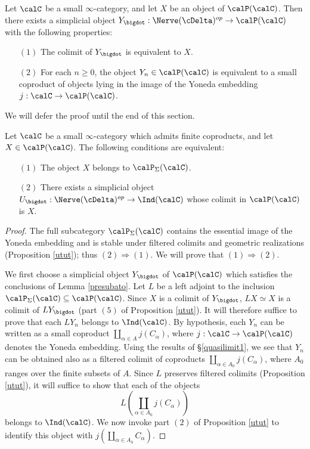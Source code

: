 \begin{lemma}\label{presubato}
Let $\calC$ be a small $\infty$-category, and let $X$ be an object of $\calP(\calC)$. Then
there exists a simplicial object $Y_{\bigdot}: \Nerve(\cDelta)^{op} \rightarrow \calP(\calC)$ with the following properties:
\begin{itemize}
\item[$(1)$] The colimit of $Y_{\bigdot}$ is equivalent to $X$.
\item[$(2)$] For each $n \geq 0$, the object $Y_n \in \calP(\calC)$ is equivalent to a small coproduct of objects lying in the image of the Yoneda embedding $j: \calC \rightarrow \calP(\calC)$. 
\end{itemize}
\end{lemma}

We will defer the proof until the end of this section.

\begin{lemma}\label{subato}
Let $\calC$ be a small $\infty$-category which admits finite coproducts, and let
$X \in \calP(\calC)$. The following conditions are equivalent:
\begin{itemize}
\item[$(1)$] The object $X$ belongs to $\calP_{\Sigma}(\calC)$.
\item[$(2)$] There exists a simplicial object $U_{\bigdot}: \Nerve( \cDelta)^{op} \rightarrow \Ind(\calC)$ whose colimit in $\calP(\calC)$ is $X$.
\end{itemize}
\end{lemma}

\begin{proof}
The full subcategory $\calP_{\Sigma}(\calC)$ contains the essential image of the Yoneda embedding and is stable under filtered colimits and geometric realizations (Proposition \ref{utut}); thus $(2) \Rightarrow (1)$. We will prove that $(1) \Rightarrow (2)$. 

We first choose a simplicial object $Y_{\bigdot}$ of $\calP(\calC)$ which satisfies the conclusions of
Lemma \ref{presubato}. Let $L$ be a left adjoint to the inclusion $\calP_{\Sigma}(\calC) \subseteq \calP(\calC)$. Since $X$ is a colimit of $Y_{\bigdot}$, $LX \simeq X$ is a colimit of $LY_{\bigdot}$ (part $(5)$ of Proposition \ref{utut}). It will therefore suffice to prove that each $LY_{n}$ belongs to $\Ind(\calC)$. By hypothesis, each $Y_{n}$ can be written as a small coproduct $\coprod_{\alpha \in A} j(C_{\alpha} )$, where
$j: \calC \rightarrow \calP(\calC)$ denotes the Yoneda embedding. 
Using the results of \S \ref{quasilimit1}, we see that $Y_{n}$ can be obtained also as a filtered colimit of coproducts $\coprod_{ \alpha \in A_0} j(C_{\alpha})$, where $A_0$ ranges over the finite subsets of $A$. Since $L$ preserves filtered colimits (Proposition \ref{utut}), it will suffice to show that each of the objects
$$L(\coprod_{\alpha \in A_0} j(C_{\alpha} ))$$
belongs to $\Ind(\calC)$. We now invoke part $(2)$ of Proposition \ref{utut} to identify this object with $j( \coprod_{\alpha \in A_0} C_{\alpha} )$. 
\end{proof}

